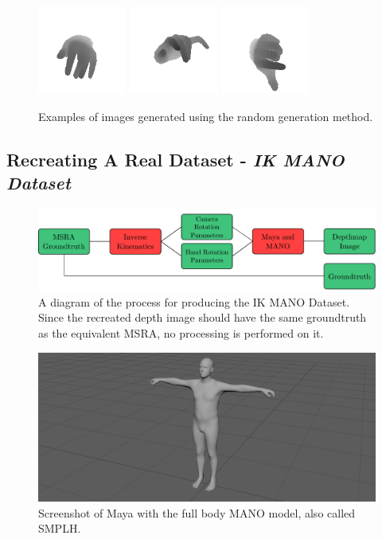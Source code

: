 \begin{figure}
    \includegraphics[width=110px]{figs/mano/21.png}
    \includegraphics[width=110px]{figs/mano/22.png}
    \includegraphics[width=110px]{figs/mano/23.png}
\caption{Examples of images generated using the random generation method.}
\label{fig:sd:nd}
\end{figure}

\subsection{Recreating A Real Dataset - {\slshape IK MANO Dataset}}
\begin{figure}
    \includegraphics[width=\linewidth]{figs/general/d_process.pdf}
    \caption{A diagram of the process for producing the IK MANO Dataset. Since the recreated depth image should have the same groundtruth as the equivalent MSRA, no processing is performed on it.}
    \label{fig:dproc}
\end{figure}
\label{sec:rard}
\label{sec:sd:d}
\begin{figure}
\includegraphics[width=\linewidth]{figs/general/maya.png}
\caption{Screenshot of Maya with the full body MANO model, also called SMPLH.}
\label{fig:smplh_maya}
\end{figure}

